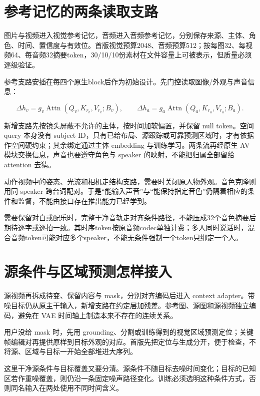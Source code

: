 \section{参考记忆的两条读取支路}\label{seedance-m19-ux53c2ux8003ux8bb0ux5fc6ux7684ux4e24ux6761ux8bfbux53d6ux652fux8def}

图片与视频进入视觉参考记忆，音频进入音频参考记忆，分别保存来源、主体、角色、时间、置信度与有效位。首版视觉预算2048、音频预算512；按每图32、每视频64、每音频32摘要token，30/10/10份素材在文件容量上可被表示，但质量必须逐级验证。

参考支路安插在每四个原生block后作为初始设计。先门控读取图像/外观与声音信息：

\[
\Delta h_v=g_v\operatorname{Attn}(Q_v,K_{r_v},V_{r_v};B_v),
\qquad
\Delta h_a=g_a\operatorname{Attn}(Q_a,K_{r_a},V_{r_a};B_a).
\]

新增支路先按镜头屏蔽不允许的主体，按时间加软偏置，并保留 null token。空间 query 本身没有 subject ID，只有已给布局、源跟踪或可靠预测区域时，才有依据作空间硬约束；其余绑定通过主体 embedding 与训练学习。两条流再经原生 AV 模块交换信息，声音也要遵守角色与 speaker 的映射，不能把归属全部留给 attention 去猜。

动作视频中的姿态、光流和相机走结构支路，需要时关闭原人物外观。音色克隆则用同 speaker 跨台词配对。于是“能输入声音”与“能保持指定音色”仍隔着相应的条件和监督，不能由接口存在推出能力已经学到。

需要保留对白或配乐时，完整干净音轨走对齐条件路径，不能压成32个音色摘要后期待逐字或逐拍一致。其时序token按原音频codec单独计费；多人同时说话时，混合音频token可能对应多个speaker，不能无条件强制一个token只绑定一个人。

\section{源条件与区域预测怎样接入}\label{seedance-m19-ux6e90ux6761ux4ef6ux4e0eux533aux57dfux9884ux6d4bux600eux6837ux63a5ux5165}

源视频再拆成待变、保留内容与 mask，分别对齐编码后进入 context adapter。带噪目标仍从原主干输入，新增支路在约定层加残差。参考图、源图和源视频独立编码，避免在 VAE 时间轴上制造本来不存在的连续关系。

用户没给 mask 时，先用 grounding、分割或训练得到的视觉区域预测定位；关键帧编辑对再提供原样到目标外观的对应。首版先把定位与生成分开，便于检查，不将源、区域与目标一开始全部堆进大序列。

这里干净源条件与目标覆盖又要分清。源条件不随目标去噪时间变化；目标的已知区若作重噪覆盖，则仍沿一条固定噪声路径变化。训练必须选明这种条件方式，否则同名输入在两处使用不同时间含义。

